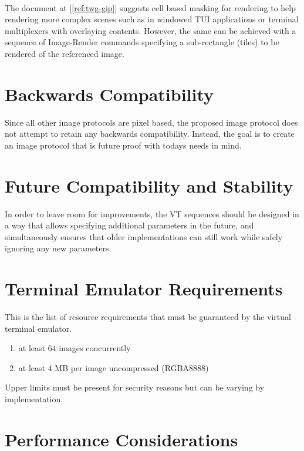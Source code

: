 \documentclass[a4paper]{article}
\begin{document}
\paragraph*{}

The document at [\ref{ref:twg-gip}] suggests cell based masking for rendering to help rendering more
complex scenes such as in windowed TUI applications or terminal multiplexers with overlaying contents.
However, the same can be achieved with a sequence of Image-Render commands specifying a
sub-rectangle (tiles) to be rendered of the referenced image.

\section{Backwards Compatibility} %

Since all other image protocols are pixel based, the proposed image protocol does not
attempt to retain any backwards compatibility. Instead, the goal is to create
an image protocol that is future proof with todays needs in mind.

\section{Future Compatibility and Stability} %

In order to leave room for improvements, the VT sequences should be designed in a way
that allows specifying additional parameters in the future, and simultaneously ensures
that older implementations can still work while safely ignoring any new parameters.

\section{Terminal Emulator Requirements} %

This is the list of resource requirements that must be guaranteed
by the virtual terminal emulator.

\begin{enumerate}
    \item at least 64 images concurrently
    \item at least 4 MB per image uncompressed (RGBA8888)
\end{enumerate}

Upper limits must be present for security reasons but can be varying by implementation.

\section{Performance Considerations} %
\end{document}
